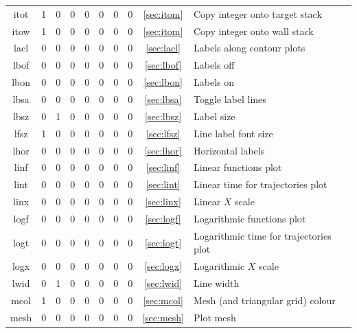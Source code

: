 \documentclass[a4paper,10pt]{report}
\begin{document}
\begin{center}
\begin{longtable}{|c|c|c|c|c|c|c|c|c|l|}
    itot \index{b2plot, itot}      & 1 & 0 & 0 & 0 & 0 & 0 & 0 & \ref{sec:itom}   & Copy integer onto target stack \\
    itow \index{b2plot, itow}      & 1 & 0 & 0 & 0 & 0 & 0 & 0 & \ref{sec:itom}   & Copy integer onto wall stack \\
    lacl \index{b2plot, lacl}      & 0 & 0 & 0 & 0 & 0 & 0 & 0 & \ref{sec:lacl}   & Labels along contour plots \\
    lbof \index{b2plot, lbof}      & 0 & 0 & 0 & 0 & 0 & 0 & 0 & \ref{sec:lbof}   & Labels off \\
    lbon \index{b2plot, lbon}      & 0 & 0 & 0 & 0 & 0 & 0 & 0 & \ref{sec:lbon}   & Labels on \\
    lbsa \index{b2plot, lbsa}      & 0 & 0 & 0 & 0 & 0 & 0 & 0 & \ref{sec:lbsa}   & Toggle label lines \\
    lbsz \index{b2plot, lbsz}      & 0 & 1 & 0 & 0 & 0 & 0 & 0 & \ref{sec:lbsz}   & Label size \\
    lfsz \index{b2plot, lfsz}      & 1 & 0 & 0 & 0 & 0 & 0 & 0 & \ref{sec:lfsz}   & Line label font size \\
    lhor \index{b2plot, lhor}      & 0 & 0 & 0 & 0 & 0 & 0 & 0 & \ref{sec:lhor}   & Horizontal labels \\
    linf \index{b2plot, linf}      & 0 & 0 & 0 & 0 & 0 & 0 & 0 & \ref{sec:linf}   & Linear functions plot \\
    lint \index{b2plot, lint}      & 0 & 0 & 0 & 0 & 0 & 0 & 0 & \ref{sec:lint}   & Linear time for trajectories plot \\
    linx \index{b2plot, linx}      & 0 & 0 & 0 & 0 & 0 & 0 & 0 & \ref{sec:linx}   & Linear $X$ scale \\
    logf \index{b2plot, logf}      & 0 & 0 & 0 & 0 & 0 & 0 & 0 & \ref{sec:logf}   & Logarithmic functions plot \\
    logt \index{b2plot, logt}      & 0 & 0 & 0 & 0 & 0 & 0 & 0 & \ref{sec:logt}   & Logarithmic time for trajectories plot \\
    logx \index{b2plot, logx}      & 0 & 0 & 0 & 0 & 0 & 0 & 0 & \ref{sec:logx}   & Logarithmic $X$ scale \\
    lwid \index{b2plot, lwid}      & 0 & 1 & 0 & 0 & 0 & 0 & 0 & \ref{sec:lwid}   & Line width \\
    mcol \index{b2plot, mcol}      & 1 & 0 & 0 & 0 & 0 & 0 & 0 & \ref{sec:mcol}   & Mesh (and triangular grid) colour \\
    mesh \index{b2plot, mesh}      & 0 & 0 & 0 & 0 & 0 & 0 & 0 & \ref{sec:mesh}   & Plot mesh \\

\end{longtable}
\end{center}
\end{document}
